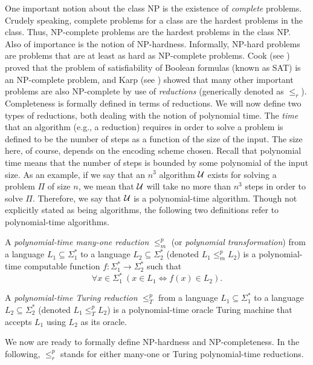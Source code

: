 One important notion about the class NP is the existence of {\em complete\/}
problems. Crudely speaking, complete problems for a class are the hardest
problems in the class.  Thus, NP-complete problems are the hardest problems
in the class NP.  Also of importance is the notion of NP-hardness.
Informally, NP-hard problems are problems that are at least as hard as
NP-complete problems. Cook (see \cite{Cook1971}) proved that the problem of
satisfiability of Boolean formulas (known as SAT) is an NP-complete problem,
and Karp (see \cite{Karp1972}) showed that many other important problems
are also NP-complete by use of {\em reductions\/} (generically denoted
as $\leq_r$).  Completeness is formally defined in terms of reductions.
We will now define two types of reductions, both dealing with the notion of
polynomial time.  The {\em time\/} that an algorithm (e.g., a reduction)
requires in order to solve a problem is defined to be the number of steps as
a function of the size of the input. The size here, of course, depends on the
encoding scheme chosen. Recall that polynomial time means that the number of
steps is bounded by some polynomial of the input size. As an example, if we
say that an $n^3$ algorithm $\cal U$ exists for solving a problem $\Pi$ of
size $n$, we mean that $\cal U$ will take no more than $n^3$ steps in order
to solve $\Pi$.  Therefore, we say that $\cal U$ is a polynomial-time
algorithm.  Though not explicitly stated as being algorithms, the following
two definitions refer to polynomial-time algorithms.

\begin{definition}
{\rm A {\em polynomial-time many-one reduction\/} $\leq^p_m$ (or
{\em polynomial transformation\/}) from a language $L_1\subseteq\Sigma^*_1$
to a language $L_2\subseteq\Sigma^*_2$ (denoted $L_1\leq^p_m L_2$) is a
polynomial-time computable function $f:\Sigma^*_1\rightarrow\Sigma^*_2$ such
that
$$
  \forall x\in\Sigma^*_1\ (x\in L_1 \Longleftrightarrow f(x)\in L_2).
$$}
\end{definition}

\begin{definition}
{\rm A {\em polynomial-time Turing reduction\/} $\leq^p_T$ from a language
$L_1\subseteq\Sigma^*_1$ to a language $L_2\subseteq\Sigma^*_2$ (denoted
$L_1\leq^p_T L_2$) is a polynomial-time oracle Turing machine that accepts
$L_1$ using $L_2$ as its oracle.}
\end{definition}

We now are ready to formally define NP-hardness and NP-completeness.  In the
following, $\leq^p_r$ stands for either many-one or Turing polynomial-time
reductions.

